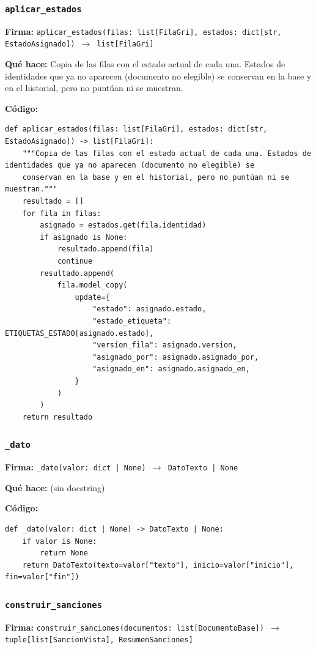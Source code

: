 \documentclass[11pt,a4paper]{article}
\begin{document}
\subsubsection*{\texttt{aplicar\_estados}}
\textbf{Firma:} \texttt{aplicar\_estados(filas: list[FilaGri], estados: dict[str, EstadoAsignado]) $\rightarrow$ list[FilaGri]}

\textbf{Qué hace:} Copia de las filas con el estado actual de cada una. Estados de identidades que ya no aparecen (documento no elegible) se
conservan en la base y en el historial, pero no puntúan ni se muestran.

\textbf{Código:}
\begin{lstlisting}
def aplicar_estados(filas: list[FilaGri], estados: dict[str, EstadoAsignado]) -> list[FilaGri]:
    """Copia de las filas con el estado actual de cada una. Estados de identidades que ya no aparecen (documento no elegible) se
    conservan en la base y en el historial, pero no puntúan ni se muestran."""
    resultado = []
    for fila in filas:
        asignado = estados.get(fila.identidad)
        if asignado is None:
            resultado.append(fila)
            continue
        resultado.append(
            fila.model_copy(
                update={
                    "estado": asignado.estado,
                    "estado_etiqueta": ETIQUETAS_ESTADO[asignado.estado],
                    "version_fila": asignado.version,
                    "asignado_por": asignado.asignado_por,
                    "asignado_en": asignado.asignado_en,
                }
            )
        )
    return resultado
\end{lstlisting}

\subsubsection*{\texttt{\_dato}}
\textbf{Firma:} \texttt{\_dato(valor: dict | None) $\rightarrow$ DatoTexto | None}

\textbf{Qué hace:} (sin docstring)

\textbf{Código:}
\begin{lstlisting}
def _dato(valor: dict | None) -> DatoTexto | None:
    if valor is None:
        return None
    return DatoTexto(texto=valor["texto"], inicio=valor["inicio"], fin=valor["fin"])
\end{lstlisting}

\subsubsection*{\texttt{construir\_sanciones}}
\textbf{Firma:} \texttt{construir\_sanciones(documentos: list[DocumentoBase]) $\rightarrow$ tuple[list[SancionVista], ResumenSanciones]}
\end{document}
